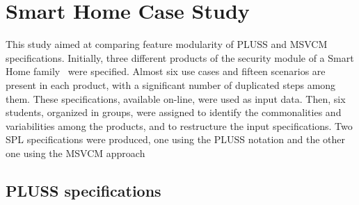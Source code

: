 \chapter{Smart Home Case Study}

This study aimed at comparing feature modularity of PLUSS and MSVCM
specifications. Initially, three different products of the security module of a
Smart Home family~\cite{Pohl:2005aa} were specified. Almost six use cases and
fifteen scenarios are present in each product, with a significant number of
duplicated steps among them. These specifications, available on-line, were used
as input data. Then, six students, organized in groups, were assigned to identify
the commonalities and variabilities among the products, and to restructure the
input specifications. Two SPL specifications were produced, one using the PLUSS
notation and the other one using the MSVCM approach

\section{PLUSS specifications}

